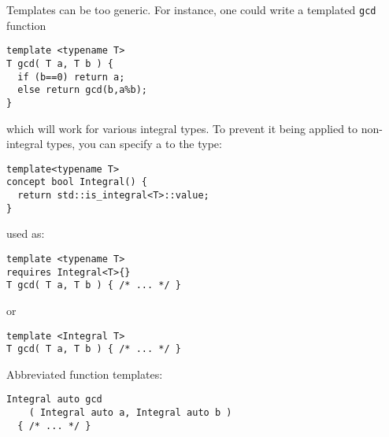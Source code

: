 Templates can be too generic. For instance, one could write a
templated \lstinline{gcd} function
\begin{lstlisting}
template <typename T>
T gcd( T a, T b ) {
  if (b==0) return a;
  else return gcd(b,a%b);
}
\end{lstlisting}
which will work for various integral types. To prevent it being
applied to non-integral types, you can specify a 
to the type:
\begin{lstlisting}
template<typename T>
concept bool Integral() {
  return std::is_integral<T>::value;
}
\end{lstlisting}
used as:
\begin{lstlisting}
template <typename T>
requires Integral<T>{}
T gcd( T a, T b ) { /* ... */ }
\end{lstlisting}
or
\begin{lstlisting}
template <Integral T>
T gcd( T a, T b ) { /* ... */ }
\end{lstlisting}
Abbreviated function templates:
\begin{lstlisting}
Integral auto gcd
    ( Integral auto a, Integral auto b )
  { /* ... */ }
\end{lstlisting}

\endinput

\Level 0 {Templating over non-types}

THESE EXAMPLES ARE NOT GOOD.

See:
\url{https://www.codeproject.com/Articles/257589/An-Idiots-Guide-to-Cplusplus-Templates-Part}

\begin{block}{Templating a value}
  Templating over integral types, not double.

  The templated quantity is a value:
  \verbatimsnippet{itemplate}
\end{block}

\begin{exercise}
  Write a class that contains an array. The length of the array should
  be templated.
\end{exercise}
